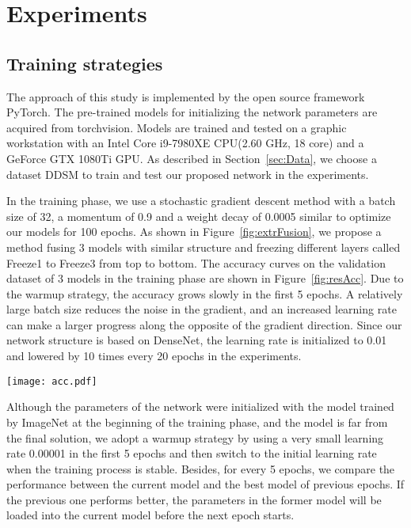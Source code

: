 \section{Experiments}
\label{sec:Exp}

\subsection{Training strategies}
\label{sec:ExpStra}

The approach of this study is implemented by 
the open source framework PyTorch. 
\cite{Abadi2016}
The pre-trained models for initializing the 
network parameters are acquired from 
torchvision.
\cite{Paszke2017}
Models are trained and tested on a graphic 
workstation with an Intel Core i9-7980XE 
CPU(2.60 GHz, 18 core) and a GeForce GTX 
1080Ti GPU. As described in 
Section~\ref{sec:Data}, 
we choose a dataset DDSM to train and test 
our proposed network in the experiments. 

In the training phase, we use a stochastic 
gradient descent method with a batch size of 32, 
\cite{Ioffe2015}
a momentum of 0.9 and a weight decay of 
0.0005 similar to optimize our models 
for 100 epochs. As shown in 
Figure~\ref{fig:extrFusion}, 
we propose a method fusing 3 models with 
similar structure and freezing different 
layers called Freeze1 to Freeze3 from top to 
bottom. The accuracy curves on the 
validation dataset of 3 models in the 
training phase are shown in 
Figure~\ref{fig:resAcc}. 
Due to the warmup strategy,
\cite{Glorot2011}
the accuracy grows 
slowly in the first 5 epochs. A relatively 
large batch size reduces the noise in the 
gradient, and an increased learning rate 
can make a larger progress along the 
opposite of the gradient direction.
\cite{Liu2020}
Since our network structure is based on 
DenseNet, the learning rate is initialized to 
0.01 and lowered by 10 times every 20 
epochs in the experiments.
\cite{Jia2014}

\begin{figure*}[!ht]
    \centering
    \texttt{[image: acc.pdf]}
    \caption{Validation accuracy.}
    \label{fig:resAcc}
\end{figure*}

Although the parameters of the network 
were initialized with the model trained by 
ImageNet at the beginning of the training 
phase, and the model is far from the final 
solution, we adopt a warmup strategy by using 
a very small learning rate 0.00001 in the 
first 5 epochs and then switch to the 
initial learning rate when the training 
process is stable. Besides, for every 5 
epochs, we compare the performance between 
the current model and the best model of 
previous epochs. If the previous one 
performs better, the parameters in the 
former model will be loaded into the 
current model before the next epoch starts.


